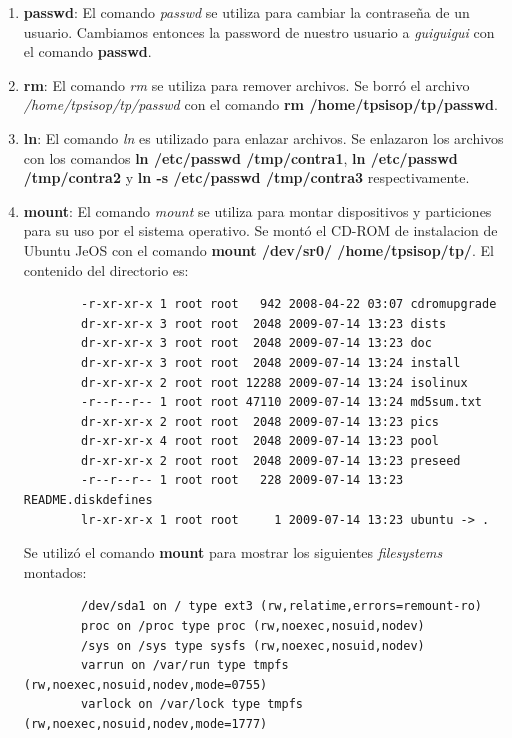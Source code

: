 \documentclass[a4paper,11pt] {article}
\begin{document}
\begin{enumerate}
		\begin{verbatim}
	 			127.0.0.1	localhost
			::1     ip6-localhost ip6-loopback
		\end{verbatim}
Luego para mostrar las l\'ineas de todos los archivos en \textit{/etc} que contienen el texto ``POSIX'' se utiliz\'o el comando \textbf{grep -r POSIX | grep -v} en la carpeta \textit{/etc}.
	\item \textbf{passwd}: El comando \textit{passwd} se utiliza para cambiar la contraseña de un usuario. Cambiamos entonces la password de nuestro usuario a \textit{guiguigui} con el comando \textbf{passwd}.
	\item \textbf{rm}: El comando \textit{rm} se utiliza para remover archivos. Se borr\'o el archivo \textit{/home/tpsisop/tp/passwd} con el comando \textbf{rm /home/tpsisop/tp/passwd}.
	\item \textbf{ln}: El comando \textit{ln} es utilizado para enlazar archivos. Se enlazaron los archivos con los comandos \textbf{ln /etc/passwd /tmp/contra1}, \textbf{ln /etc/passwd /tmp/contra2} y \textbf{ln -s /etc/passwd /tmp/contra3} respectivamente.
	\item \textbf{mount}: El comando \textit{mount} se utiliza para montar dispositivos y particiones para su uso por el sistema operativo. Se mont\'o el CD-ROM de instalacion de Ubuntu JeOS con el comando \textbf{mount /dev/sr0/ /home/tpsisop/tp/}. El contenido del directorio es:
	\begin{verbatim}
		-r-xr-xr-x 1 root root   942 2008-04-22 03:07 cdromupgrade
		dr-xr-xr-x 3 root root  2048 2009-07-14 13:23 dists
		dr-xr-xr-x 3 root root  2048 2009-07-14 13:23 doc
		dr-xr-xr-x 3 root root  2048 2009-07-14 13:24 install
		dr-xr-xr-x 2 root root 12288 2009-07-14 13:24 isolinux
		-r--r--r-- 1 root root 47110 2009-07-14 13:24 md5sum.txt
		dr-xr-xr-x 2 root root  2048 2009-07-14 13:23 pics
		dr-xr-xr-x 4 root root  2048 2009-07-14 13:23 pool
		dr-xr-xr-x 2 root root  2048 2009-07-14 13:23 preseed
		-r--r--r-- 1 root root   228 2009-07-14 13:23 README.diskdefines
		lr-xr-xr-x 1 root root     1 2009-07-14 13:23 ubuntu -> .
	\end{verbatim}
	Se utiliz\'o el comando \textbf{mount} para mostrar los siguientes \textit{filesystems} montados:
	\begin{verbatim}
		/dev/sda1 on / type ext3 (rw,relatime,errors=remount-ro)
		proc on /proc type proc (rw,noexec,nosuid,nodev)
		/sys on /sys type sysfs (rw,noexec,nosuid,nodev)
		varrun on /var/run type tmpfs (rw,noexec,nosuid,nodev,mode=0755)
		varlock on /var/lock type tmpfs (rw,noexec,nosuid,nodev,mode=1777)

\end{verbatim}
\end{enumerate}
\end{document}
